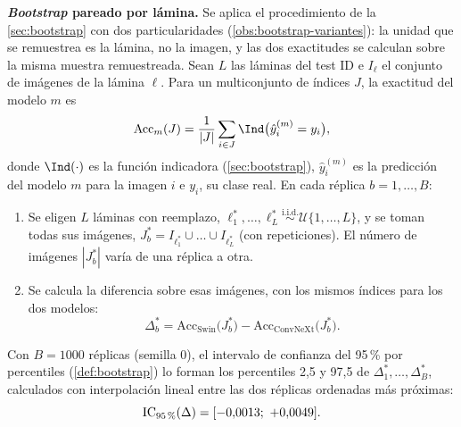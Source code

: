 \textbf{\emph{Bootstrap} pareado por lámina.} Se aplica el procedimiento de la \cref{sec:bootstrap} con dos particularidades (\cref{obs:bootstrap-variantes}): la unidad que se remuestrea es la lámina, no la imagen, y las dos exactitudes se calculan sobre la misma muestra remuestreada. Sean $L$ las láminas del test ID e $I_\ell$ el conjunto de imágenes de la lámina $\ell$. Para un multiconjunto de índices $J$, la exactitud del modelo $m$ es
\[
  \mathrm{Acc}_m(J) = \frac{1}{|J|} \sum_{i \in J} \Ind\bigl(\hat y^{(m)}_i = y_i\bigr),
\]
donde $\Ind(\cdot)$ es la función indicadora (\cref{sec:bootstrap}), $\hat y^{(m)}_i$ es la predicción del modelo $m$ para la imagen $i$ e $y_i$, su clase real.
En cada réplica $b = 1, \dots, B$:
\begin{enumerate}
  \item Se eligen $L$ láminas con reemplazo, $\ell^{*}_{1}, \dots, \ell^{*}_{L} \overset{\text{i.i.d.}}{\sim} \mathcal{U}\{1, \dots, L\}$, y se toman todas sus imágenes, $J^{*}_{b} = I_{\ell^{*}_{1}} \cup \dots \cup I_{\ell^{*}_{L}}$ (con repeticiones). El número de imágenes $|J^{*}_{b}|$ varía de una réplica a otra.
  \item Se calcula la diferencia sobre esas imágenes, con los mismos índices para los dos modelos:
  \[
    \Delta^{*}_{b} = \mathrm{Acc}_{\text{Swin}}\bigl(J^{*}_{b}\bigr) - \mathrm{Acc}_{\text{ConvNeXt}}\bigl(J^{*}_{b}\bigr).
  \]
\end{enumerate}
Con $B = \num{1000}$ réplicas (semilla 0), el intervalo de confianza del 95\,\% por percentiles (\cref{def:bootstrap}) lo forman los percentiles 2,5 y 97,5 de $\Delta^{*}_{1}, \dots, \Delta^{*}_{B}$, calculados con interpolación lineal entre las dos réplicas ordenadas más próximas:
\[
  \text{IC}_{\text{95\,\%}}(\Delta) = [-0{,}0013;\ +0{,}0049].
\]


